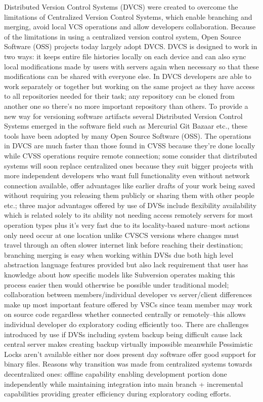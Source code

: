 Distributed Version Control Systems (DVCS) were created to overcome the limitations of Centralized Version Control Systems, which enable branching and merging, avoid local VCS operations and allow developers collaboration.
Because of the limitations in using a centralized version control system, Open Source Software (OSS) projects today largely adopt DVCS. DVCS is designed to work in two ways: it keeps entire file histories locally on each device and can also sync local modifications made by users with servers again when necessary so that these modifications can be shared with everyone else. In DVCS developers are able to work separately or together but working on the same project as they have access to all repositories needed for their task; any repository can be cloned from another one so there's no more important repository than others.
To provide a new way for versioning software artifacts several Distributed Version Control Systems emerged in the software field such as Mercurial Git Bazaar etc., these tools have been adopted by many Open Source Software (OSS). The operations in DVCS are much faster than those found in CVSS because they're done locally while CVSS operations require remote connection; some consider that distributed systems will soon replace centralized ones because they suit bigger projects with more independent developers who want full functionality even without network connection available, offer advantages like earlier drafts of your work being saved without requiring you releasing them publicly or sharing them with other people etc.; three major advantages offered by use of DVSs include flexibility availability which is related solely to its ability not needing access remotely servers for most operation types plus it's very fast due to its locality-based nature--most actions only need occur at one location unlike CVSCS versions where changes must travel through an often slower internet link before reaching their destination; branching merging is easy when working within DVSs due both high level abstraction language features provided but also lack requirement that user has knowledge about how specific models like Subversion operates making this process easier then would otherwise be possible under traditional model; collaboration between members/individual developer vs server/client differences make up most important feature offered by VSCs since team member may work on source code regardless whether connected centrally or remotely--this allows individual developer do exploratory coding efficiently too. There are challenges introduced by use if DVSs including system backup being difficult cause lack central server makes creating backup virtually impossible meanwhile Pessimistic Locks aren't available either nor does present day software offer good support for binary files. Reasons why transition was made from centralized systems towards decentralized ones: offline capability enabling development portion done independently while maintaining integration into main branch + incremental capabilities providing greater efficiency during exploratory coding efforts.

